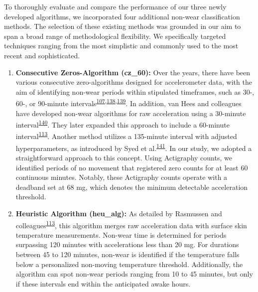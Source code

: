 \documentclass[
  10pt,
]{scrbook}
\begin{document}
To thoroughly evaluate and compare the performance of our three newly
developed algorithms, we incorporated four additional non-wear
classification methods. The selection of these existing methods was
grounded in our aim to span a broad range of methodological flexibility.
We specifically targeted techniques ranging from the most simplistic and
commonly used to the most recent and sophisticated.

\begin{enumerate}
\def\labelenumi{\arabic{enumi}.}
\item
  \textsf{\textbf{Consecutive Zeros-Algorithm (cz\_60):}} Over the
  years, there have been various consecutive zero-algorithms designed
  for accelerometer data, with the aim of identifying non-wear periods
  within stipulated timeframes, such as 30-, 60-, or 90-minute
  intervals\textsuperscript{\protect\hyperlink{ref-hecht_methodology_2009}{107},\protect\hyperlink{ref-troiano_physical_2008}{138},\protect\hyperlink{ref-choi_validation_2011}{139}}.
  In addition, van Hees and colleagues have developed non-wear
  algorithms for raw acceleration using a 30-minute
  interval\textsuperscript{\protect\hyperlink{ref-van_hees_estimation_2011}{140}}.
  They later expanded this approach to include a 60-minute
  interval\textsuperscript{\protect\hyperlink{ref-rasmussen_short-term_2020}{113}}.
  Another method utilizes a 135-minute interval with adjusted
  hyperparameters, as introduced by Syed et
  al.\textsuperscript{\protect\hyperlink{ref-syed_evaluating_2020}{141}}.
  In our study, we adopted a straightforward approach to this concept.
  Using Actigraphy counts, we identified periods of no movement that
  registered zero counts for at least 60 continuous minutes. Notably,
  these Actigraphy counts operate with a deadband set at 68 mg, which
  denotes the minimum detectable acceleration threshold.
\item
  \textsf{\textbf{Heuristic Algorithm (heu\_alg):}} As detailed by
  Rasmussen and
  colleagues\textsuperscript{\protect\hyperlink{ref-rasmussen_short-term_2020}{113}},
  this algorithm merges raw acceleration data with surface skin
  temperature measurements. Non-wear time is determined for periods
  surpassing 120 minutes with accelerations less than 20 mg. For
  durations between 45 to 120 minutes, non-wear is identified if the
  temperature falls below a personalized non-moving temperature
  threshold. Additionally, the algorithm can spot non-wear periods
  ranging from 10 to 45 minutes, but only if these intervals end within
  the anticipated awake hours.

\end{enumerate}
\end{document}
